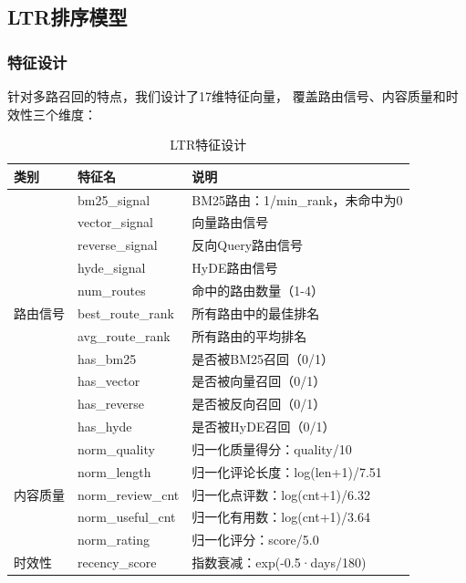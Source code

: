 \documentclass[10pt,a4paper]{article}
\begin{document}
\subsection{LTR排序模型}

\subsubsection{特征设计}

针对多路召回的特点，我们设计了17维特征向量，
覆盖路由信号、内容质量和时效性三个维度：

\begin{table}[H]
\centering
\caption{LTR特征设计}
\label{tab:features}
\begin{tabular}{@{}lll@{}}
\toprule
\textbf{类别} & \textbf{特征名} & \textbf{说明} \\
\midrule
\multirow{11}{*}{路由信号}
    & bm25\_signal      & BM25路由：1/min\_rank，未命中为0 \\
    & vector\_signal    & 向量路由信号 \\
    & reverse\_signal   & 反向Query路由信号 \\
    & hyde\_signal      & HyDE路由信号 \\
    & num\_routes       & 命中的路由数量（1-4）\\
    & best\_route\_rank & 所有路由中的最佳排名 \\
    & avg\_route\_rank  & 所有路由的平均排名 \\
    & has\_bm25         & 是否被BM25召回（0/1）\\
    & has\_vector       & 是否被向量召回（0/1）\\
    & has\_reverse      & 是否被反向召回（0/1）\\
    & has\_hyde         & 是否被HyDE召回（0/1）\\
\midrule
\multirow{5}{*}{内容质量}
    & norm\_quality     & 归一化质量得分：quality/10 \\
    & norm\_length      & 归一化评论长度：log(len+1)/7.51 \\
    & norm\_review\_cnt & 归一化点评数：log(cnt+1)/6.32 \\
    & norm\_useful\_cnt & 归一化有用数：log(cnt+1)/3.64 \\
    & norm\_rating      & 归一化评分：score/5.0 \\
\midrule
时效性  & recency\_score    & 指数衰减：exp(-0.5·days/180) \\
\bottomrule
\end{tabular}
\end{table}
\end{document}
